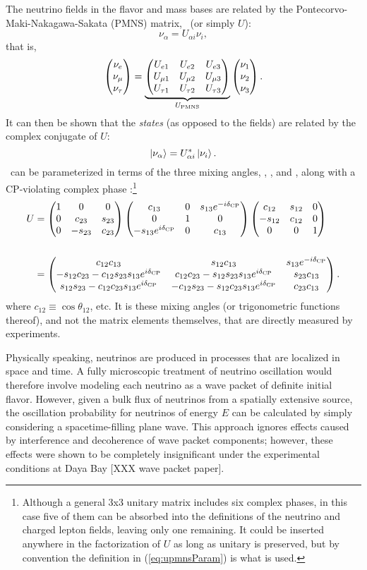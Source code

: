 \documentclass[../thesis.tex]{subfiles}
\begin{document}
The neutrino fields in the flavor and mass bases are related by the
Pontecorvo-Maki-Nakagawa-Sakata (PMNS) matrix, \upmns\ (or simply $U$):
\begin{equation*}
\nu_\alpha = U_{\alpha i} \nu_i,
\end{equation*}
that is,
\begin{equation*}
 \begin{pmatrix} {\nu_e} \\ {\nu_\mu} \\ {\nu_\tau} \end{pmatrix} = \underbrace{ \begin{pmatrix} U_{e 1} & U_{e 2} & U_{e 3} \\ U_{\mu 1} & U_{\mu 2} & U_{\mu 3} \\ U_{\tau 1} & U_{\tau 2} & U_{\tau 3} \end{pmatrix}}_{ U_\mathrm{PMNS}}  \begin{pmatrix} \nu_1 \\ \nu_2 \\ \nu_3 \end{pmatrix}.
\end{equation*}
It can then be shown that the \emph{states} (as opposed to the fields) are
related by the complex conjugate of $U$:
\begin{equation}
  \label{eq:nuStateRel}
  \ket{\nu_\alpha} = U^*_{\alpha i}\ket{\nu_i}.
\end{equation}
\upmns\ can be parameterized in terms of the three mixing angles, \tAB, \tBC,
and \tAC, along with a CP-violating complex phase \dcp:\footnote{Although a
  general 3x3 unitary matrix includes six complex phases, in this case five of
  them can be absorbed into the definitions of the neutrino and charged lepton
  fields, leaving only one remaining. It could be inserted anywhere in the
  factorization of $U$ as long as unitary is preserved, but by convention the
  definition in (\ref{eq:upmnsParam}) is what is used.}
\begin{align}
  \label{eq:upmnsParam}
  \begin{split}
    U &=  \begin{pmatrix} 1 & 0 & 0 \\ 0 &  c_{23} &  s_{23} \\ 0 & - s_{23} &  c_{23} \end{pmatrix} \begin{pmatrix}  c_{13} & 0 &  s_{13}e^{-i\delta_\text{CP}} \\ 0 & 1 & 0 \\ - s_{13}e^{i\delta_\text{CP}} & 0 &  c_{13} \end{pmatrix} \begin{pmatrix}  c_{12} &  s_{12} & 0 \\ - s_{12} &  c_{12} & 0 \\ 0 & 0 & 1 \end{pmatrix} \\\\
    &=  \begin{pmatrix} c_{12}c_{13} & s_{12} c_{13} & s_{13}e^{-i\delta_\text{CP}} \\-s_{12}c_{23} - c_{12}s_{23}s_{13}e^{i\delta_\text{CP}} & c_{12}c_{23} - s_{12}s_{23}s_{13}e^{i\delta_\text{CP}} & s_{23}c_{13}\\s_{12}s_{23} - c_{12}c_{23}s_{13}e^{i\delta_\text{CP}} & -c_{12}s_{23} - s_{12}c_{23}s_{13}e^{i\delta_\text{CP}} & c_{23}c_{13} \end{pmatrix}.
  \end{split}
\end{align}
where $c_{12} \equiv \cos\theta_{12}$, etc. It is these mixing angles (or
trigonometric functions thereof), and not the matrix elements themselves, that
are directly measured by experiments.

Physically speaking, neutrinos are produced in processes that are localized in
space and time. A fully microscopic treatment of neutrino oscillation would
therefore involve modeling each neutrino as a wave packet of definite initial
flavor. However, given a bulk flux of neutrinos from a spatially extensive
source, the oscillation probability for neutrinos of energy $E$ can be
calculated by simply considering a spacetime-filling plane wave. This approach
ignores effects caused by interference and decoherence of wave packet
components; however, these effects were shown to be completely insignificant
under the experimental conditions at Daya Bay [XXX wave packet paper].
\end{document}
